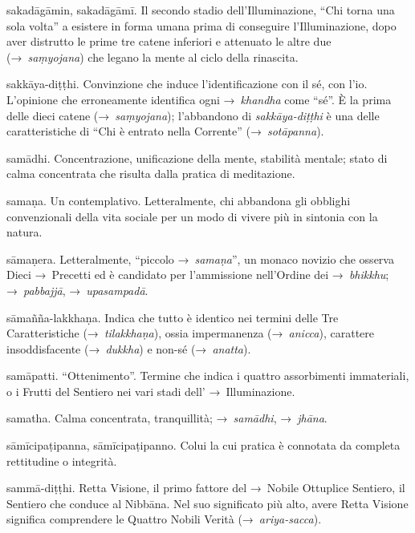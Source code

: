 \begin{glossarydescription}
\item[sakadāgāmin, sakadāgāmī.] Il secondo stadio dell'Illuminazione,
  ``Chi torna una sola volta'' a esistere in forma umana prima di conseguire
  l'Illuminazione, dopo aver distrutto le prime tre catene inferiori e attenuato
  le altre due (→~\emph{saṃyojana}) che legano la mente al ciclo della
  rinascita.

\item[sakkāya-diṭṭhi.] Convinzione che induce l'identificazione con il sé,
  con l'io. L'opinione che erroneamente identifica ogni →~\emph{khandha} come
  ``sé''. È la prima delle dieci catene (→~\emph{saṃyojana}); l'abbandono di
  \emph{sakkāya-diṭṭhi} è una delle caratteristiche di ``Chi è entrato nella
  Corrente'' (→~\emph{sotāpanna}).

\item[samādhi.] Concentrazione, unificazione della mente, stabilità
  mentale; stato di calma concentrata che risulta dalla pratica di meditazione.

\item[samaṇa.] Un contemplativo. Letteralmente, chi abbandona gli obblighi
  convenzionali della vita sociale per un modo di vivere più in sintonia con la
  natura.

\item[sāmaṇera.] Letteralmente, ``piccolo →~\emph{samaṇa}'', un monaco
  novizio che osserva Dieci →~Precetti ed è candidato per l'ammissione
  nell'Ordine dei →~\emph{bhikkhu}; →~\emph{pabbajjā}, →~\emph{upasampadā}.

\item[sāmañña-lakkhaṇa.] Indica che tutto è identico nei termini delle Tre
  Caratteristiche (→~\emph{tilakkhaṇa}), ossia impermanenza (→~\emph{anicca}),
  carattere insoddisfacente (→~\emph{dukkha}) e non-sé (→~\emph{anatta}).

\item[samāpatti.] ``Ottenimento''. Termine che indica i quattro
  assorbimenti immateriali, o i Frutti del Sentiero nei vari stadi dell'
  →~Illuminazione.

\item[samatha.] Calma concentrata, tranquillità; →~\emph{samādhi},
  →~\emph{jhāna}.

\item[sāmīcipaṭipanna, sāmīcipaṭipanno.] Colui la cui pratica è connotata
  da completa rettitudine o integrità.

\item[sammā-diṭṭhi.] Retta Visione, il primo fattore del →~Nobile
  Ottuplice Sentiero, il Sentiero che conduce al Nibbāna. Nel suo
  significato più alto, avere Retta Visione significa comprendere le Quattro
  Nobili Verità (→~\emph{ariya-sacca}).


\end{glossarydescription}
